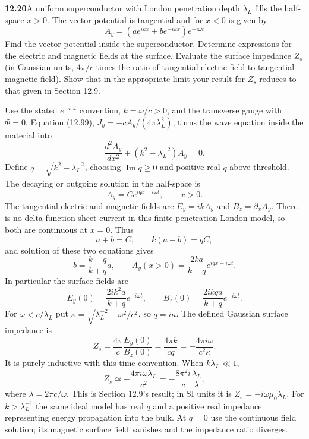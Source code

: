 \par\bigskip
\noindent\textbf{12.20}\quad A uniform superconductor with London penetration depth $\lambda_{L}$ fills the half-space $x>0$. The vector potential is tangential and for $x<0$ is given by
\[
A_{y}=(ae^{ikx}+be^{-ikx})e^{-i\omega t}
\]
Find the vector potential inside the superconductor. Determine expressions for the electric and magnetic fields at the surface. Evaluate the surface impedance $Z_{s}$ (in Gaussian units, $4\pi/c$ times the ratio of tangential electric field to tangential magnetic field). Show that in the appropriate limit your result for $Z_{s}$ reduces to that given in Section 12.9.
\solution

Use the stated $e^{-i\omega t}$ convention, $k=\omega/c>0$,
and the transverse gauge with $\Phi=0$.
Equation (12.99), $J_y=-cA_y/(4\pi\lambda_L^2)$, turns the
wave equation inside the material into
\[
\frac{d^2A_y}{dx^2}+
 \left(k^2-\lambda_L^{-2}\right)A_y=0.
\]
Define $q=\sqrt{k^2-\lambda_L^{-2}}$, choosing $\operatorname{Im}q\geq0$
and positive real $q$ above threshold.  The decaying or outgoing
solution in the half-space is
\[
A_y=C e^{iqx-i\omega t},\qquad x>0.
\]
The tangential electric and magnetic fields are
$E_y=ikA_y$ and $B_z=\partial_xA_y$.
There is no delta-function sheet current in this finite-penetration
London model, so both are continuous at $x=0$.  Thus
\[
a+b=C,\qquad k(a-b)=qC,
\]
and solution of these two equations gives
\[
\boxed{b=\frac{k-q}{k+q}a,\qquad
A_y(x>0)=\frac{2ka}{k+q}e^{iqx-i\omega t}.}
\]
In particular the surface fields are
\[
\boxed{E_y(0)=\frac{2ik^2a}{k+q}e^{-i\omega t},\qquad
B_z(0)=\frac{2ikqa}{k+q}e^{-i\omega t}.}
\]
For $\omega<c/\lambda_L$ put
$\kappa=\sqrt{\lambda_L^{-2}-\omega^2/c^2}$, so $q=i\kappa$.
The defined Gaussian surface impedance is
\[
\boxed{Z_s=\frac{4\pi}{c}\frac{E_y(0)}{B_z(0)}
=\frac{4\pi k}{cq}
=-\frac{4\pi i\omega}{c^2\kappa}.}
\]
It is purely inductive with this time convention.  When
$k\lambda_L\ll1$,
\[
\boxed{Z_s\simeq-\frac{4\pi i\omega\lambda_L}{c^2}
=-\frac{8\pi^2i}{c}\frac{\lambda_L}{\lambda},}
\]
where $\lambda=2\pi c/\omega$.  This is Section 12.9's result;
in SI units it is $Z_s=-i\omega\mu_0\lambda_L$.
For $k>\lambda_L^{-1}$ the same ideal model has real $q$ and a
positive real impedance representing energy propagation into the
bulk.  At $q=0$ use the continuous field solution; its magnetic
surface field vanishes and the impedance ratio diverges.

